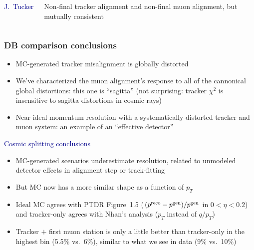 \documentclass[compress]{beamer}
\begin{document}
\begin{frame}
\begin{columns}
{}

\scriptsize
\textcolor{darkblue}{J.~Tucker}

\vspace{1 cm}
Non-final tracker alignment and non-final muon alignment, but mutually consistent

\vspace{2 cm}
\end{columns}
\end{frame}

\begin{frame}
\frametitle{DB comparison conclusions}
\begin{itemize}
\item MC-generated tracker misalignment is globally distorted
\item We've characterized the muon alignment's response to all of the cannonical global distortions: this one is ``sagitta'' (not surprising: tracker $\chi^2$ is insensitive to sagitta distortions in cosmic rays)
\item Near-ideal momentum resolution with a systematically-distorted tracker and muon system: an example of an ``effective detector''
\end{itemize}

\vspace{0.2 cm}
\hspace{-0.83 cm} \textcolor{darkblue}{\Large Cosmic splitting conclusions}
\begin{itemize}
\item MC-generated scenarios underestimate resolution, related to unmodeled detector effects in alignment step or track-fitting
\item But MC now has a more similar shape as a function of $p_T$
\item Ideal MC agrees with PTDR Figure~1.5 ($(p^{\mbox{\scriptsize reco}} - p^{\mbox{\scriptsize gen}})/p^{\mbox{\scriptsize gen}}$ in $0 < \eta < 0.2$) and tracker-only agrees with Nhan's analysis ($p_T$ instead of $q/p_T$)
\item Tracker $+$ first muon station is only a little better than tracker-only in the highest bin (5.5\% vs.\ 6\%), similar to what we see in data (9\% vs.\ 10\%)
\end{itemize}
\end{frame}
\end{document}
